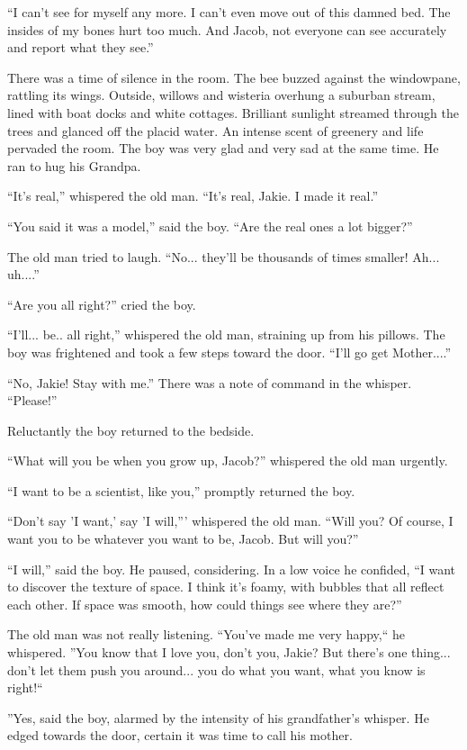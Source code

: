 \documentclass[english,11pt,letterpaper,onecolumn]{scrbook}
\begin{document}
	``I can't see for myself any more.  I can't even move out of this damned bed.  The insides of my bones hurt too much.  And Jacob, not everyone can see accurately and report what they see.''

	There was a time of silence in the room.  The bee buzzed against the windowpane, rattling its wings.  Outside, willows and wisteria overhung a suburban stream, lined with boat docks and white cottages.  Brilliant sunlight streamed through the trees and glanced off the placid water.  An intense scent of greenery and life pervaded the room.  The boy was very glad and very sad at the same time.  He ran to hug his Grandpa.

	``It's real,'' whispered the old man.  ``It's real, Jakie.  I made it real.''

	``You said it was a model,'' said the boy.  ``Are the real ones a lot bigger?''

	The old man tried to laugh.  ``No... they'll be thousands of times smaller!  Ah... uh....''

	``Are you all right?'' cried the boy.

	``I'll... be.. all right,'' whispered the old man, straining up from his pillows.  The boy was frightened and took a few steps toward the door.  ``I'll go get Mother....''

	``No, Jakie!  Stay with me.''  There was a note of command in the whisper.  ``Please!''

	Reluctantly the boy returned to the bedside.

	``What will you be when you grow up, Jacob?'' whispered the old man urgently.

	``I want to be a scientist, like you,'' promptly returned the boy.

	``Don't say 'I want,' say 'I will,''' whispered the old man.  ``Will you?  Of course, I want you to be whatever you want to be, Jacob.  But will you?''

	``I will,'' said the boy.  He paused, considering.  In a low voice he confided, ``I want to discover the texture of space.  I think it's foamy, with bubbles that all reflect each other.  If space was smooth, how could things see where they are?''

	The old man was not really listening.  ``You've made me very happy,`` he whispered.  ''You know that I love you, don't you, Jakie?  But there's one thing... don't let them push you around... you do what you want, what you know is right!``

	''Yes, said the boy, alarmed by the intensity of his grandfather's whisper.  He edged towards the door, certain it was time to call his mother.
\end{document}

